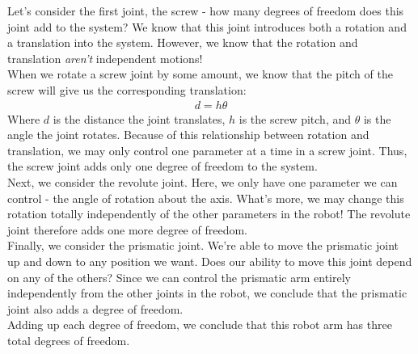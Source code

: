\documentclass[oneside]{book}
\begin{document}
Let's consider the first joint, the screw - how many degrees of freedom does this joint add to the system? We know that this joint introduces both a rotation and a translation into the system. However, we know that the rotation and translation \textit{aren't} independent motions!\\
When we rotate a screw joint by some amount, we know that the pitch of the screw will give us the corresponding translation:
\begin{align}
    d = h\theta
\end{align}
Where $d$ is the distance the joint translates, $h$ is the screw pitch, and $\theta$ is the angle the joint rotates. Because of this relationship between rotation and translation, we may only control one parameter at a time in a screw joint. Thus, the screw joint adds only one degree of freedom to the system.\\
Next, we consider the revolute joint. Here, we only have one parameter we can control - the angle of rotation about the axis. What's more, we may change this rotation totally independently of the other parameters in the robot! The revolute joint therefore adds one more degree of freedom.\\
Finally, we consider the prismatic joint. We're able to move the prismatic joint up and down to any position we want. Does our ability to move this joint depend on any of the others? Since we can control the prismatic arm entirely independently from the other joints in the robot, we conclude that the prismatic joint also adds a degree of freedom.\\
Adding up each degree of freedom, we conclude that this robot arm has three total degrees of freedom.
\end{document}
